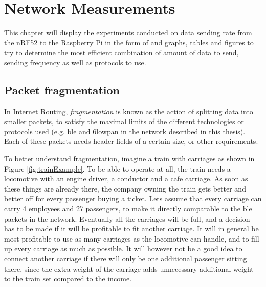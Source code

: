 \chapter{Network Measurements}
\label{chp:measurements2}

This chapter will display the experiments conducted on data sending rate from the nRF52 to the Raspberry Pi in the form of and graphs, tables and figures to try to determine the most efficient combination of amount of data to send, sending frequency as well as protocols to use. 




 



\section{Packet fragmentation}

In Internet Routing, \textit{fragmentation} is known as the action of splitting data into smaller packets, to satisfy the maximal limits of the different technologies or protocols used (e.g. \gls{ble} and \gls{6lowpan} in the network described in this thesis). Each of these packets needs header fields of a certain size, or other requirements.

To better understand fragmentation, imagine a train with carriages as shown in Figure \ref{fig:trainExample}. To be able to operate at all, the train needs a locomotive with an engine driver, a conductor and a cafe carriage. As soon as these things are already there, the company owning the train gets better and better off for every passenger buying a ticket. Lets assume that every carriage can carry 4 employees and 27 passengers, to make it directly comparable to the \gls{ble} packets in the network. Eventually all the carriages will be full, and a decision has to be made if it will be profitable to fit another carriage. It will in general be most profitable to use as many carriages as the locomotive can handle, and to fill up every carriage as much as possible. It will however not be a good idea to connect another carriage if there will only be one additional passenger sitting there, since the extra weight of the carriage adds unnecessary additional weight to the train set compared to the income. 

